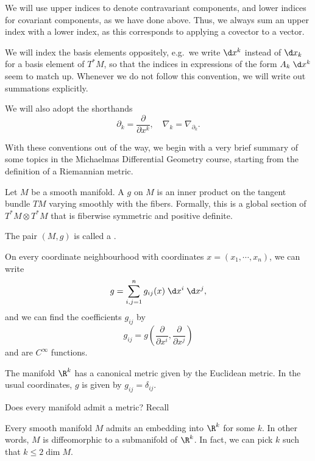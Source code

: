 \documentclass[a4paper]{article}
\begin{document}
We will use upper indices to denote contravariant components, and lower indices for covariant components, as we have done above. Thus, we always sum an upper index with a lower index, as this corresponds to applying a covector to a vector.

We will index the basis elements oppositely, e.g.\ we write $\d x^k$ instead of $\d x_k$ for a basis element of $T^*M$, so that the indices in expressions of the form $A_k \;\d x^k$ seem to match up. Whenever we do not follow this convention, we will write out summations explicitly.

We will also adopt the shorthands
\[
  \partial_k = \frac{\partial}{\partial x^k},\quad \nabla_k = \nabla_{\partial_k}.
\]

With these conventions out of the way, we begin with a very brief summary of some topics in the Michaelmas Differential Geometry course, starting from the definition of a Riemannian metric.

\begin{defi}
  Let $M$ be a smooth manifold. A  $g$ on $M$ is an inner product on the tangent bundle $TM$ varying smoothly with the fibers. Formally, this is a global section of $T^*M \otimes T^*M$ that is fiberwise symmetric and positive definite.

  The pair $(M, g)$ is called a .
\end{defi}

On every coordinate neighbourhood with coordinates $x = (x_1, \cdots, x_n)$, we can write
\[
  g = \sum_{i, j = 1}^n g_{ij}(x)\;\d x^i\; \d x^j,
\]
and we can find the coefficients $g_{ij}$ by
\[
  g_{ij} = g\left(\frac{\partial}{\partial x^i}, \frac{\partial}{\partial x^j}\right)
\]
and are $C^\infty$ functions.

\begin{eg}
  The manifold $\R^k$ has a canonical metric given by the Euclidean metric. In the usual coordinates, $g$ is given by $g_{ij} = \delta_{ij}$.
\end{eg}

Does every manifold admit a metric? Recall

\begin{thm}
  Every smooth manifold $M$ admits an embedding into $\R^k$ for some $k$. In other words, $M$ is diffeomorphic to a submanifold of $\R^k$. In fact, we can pick $k$ such that $k \leq 2 \dim M$.
\end{thm}
\end{document}
